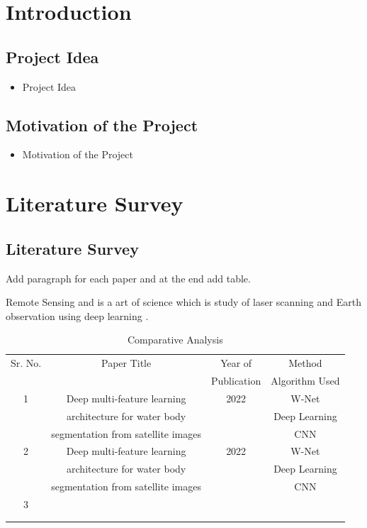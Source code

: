 \documentclass[oneside,a4paper,12pt]{report}
\begin{document}
\setlength{\parindent}{11mm}
\chapter{Introduction}
\section{Project Idea}
\begin{itemize}
\item Project Idea
\end{itemize}

\section{Motivation of the Project}  
\begin{itemize}
\item Motivation of the Project
\end{itemize}


\chapter{Literature Survey}
\section{Literature Survey}
Add paragraph for each paper and at the end add table. 

Remote Sensing \cite{r1} and \cite{r2} is a art of science which is study \cite{r3} of laser scanning and Earth observation using deep learning \cite{r4}.  

\begin{table}[!htbp]
\begin{center}
\def\arraystretch{1.5}
  \begin{tabular}{| c | c | c | c |}
\hline
Sr. No. &	Paper Title &	Year of & Method \\
&	 &	Publication & Algorithm Used \\

\hline
1 &	Deep multi-feature learning  &	 2022  & W-Net\\
 &	architecture for water body  &	 &Deep Learning \\
 &	 segmentation from satellite images  & 	 & CNN\\

 \hline
2 &	Deep multi-feature learning  &	 2022  & W-Net\\
 &	architecture for water body  &	 &Deep Learning \\
 &	 segmentation from satellite images  & 	 & CNN\\
\hline
3 &	  &	   & \\
 &	  &	 & \\
 &	   & 	 & \\
\hline

\end{tabular}
 \caption { Comparative Analysis }
 \label{tab:CompAna}
\end{center}

\end{table}
\end{document}
